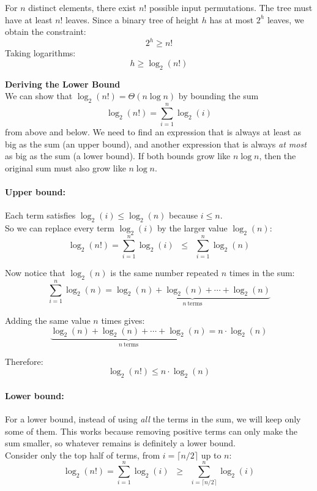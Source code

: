\documentclass[12pt]{article}
\begin{document}
For $n$ distinct elements, there exist $n!$ possible input permutations. The tree must have at least $n!$ leaves. Since a binary tree of height $h$ has at most $2^h$ leaves, we obtain the constraint:\\
\[
2^h \geq n!
\]
Taking logarithms:
\[
h \geq \log_2(n!)
\]

\noindent\textbf{Deriving the Lower Bound}\\

\noindent We can show that $\log_2(n!) = \Theta(n \log n)$ by bounding the sum
\[
\log_2(n!) = \sum_{i=1}^{n} \log_2(i)
\]
from above and below. We need to find an expression that is always at least as big as the sum (an upper bound), and another expression that is always \emph{at most} as big as the sum (a lower bound). If both bounds grow like $n\log n$, then the original sum must also grow like $n\log n$.

\paragraph{Upper bound:}
Each term satisfies $\log_2(i) \leq \log_2(n)$ because $i \le n$.\\
\noindent So we can replace every term $\log_2(i)$ by the larger value $\log_2(n)$:
\[
\log_2(n!) = \sum_{i=1}^{n} \log_2(i)
\;\;\le\;\;
\sum_{i=1}^{n} \log_2(n)
\]

\noindent Now notice that $\log_2(n)$ is the same number repeated $n$ times in the sum:
\[
\sum_{i=1}^{n} \log_2(n)
=
\underbrace{\log_2(n) + \log_2(n) + \cdots + \log_2(n)}_{n\ \text{terms}}
\]

\noindent Adding the same value $n$ times gives:
\[
\underbrace{\log_2(n) + \log_2(n) + \cdots + \log_2(n)}_{n\ \text{terms}}
=
n \cdot \log_2(n)
\]

\noindent Therefore:
\[
\log_2(n!) \leq n \cdot \log_2(n)
\]

\paragraph{Lower bound:}
For a lower bound, instead of using \emph{all} the terms in the sum, we will keep only some of them. This works because removing positive terms can only make the sum smaller, so whatever remains is definitely a lower bound.\\
\noindent Consider only the top half of terms, from $i=\lceil n/2 \rceil$ up to $n$:
\[
\log_2(n!) = \sum_{i=1}^{n} \log_2(i)
\;\;\ge\;\;
\sum_{i=\lceil n/2 \rceil}^{n} \log_2(i)
\]
\end{document}
